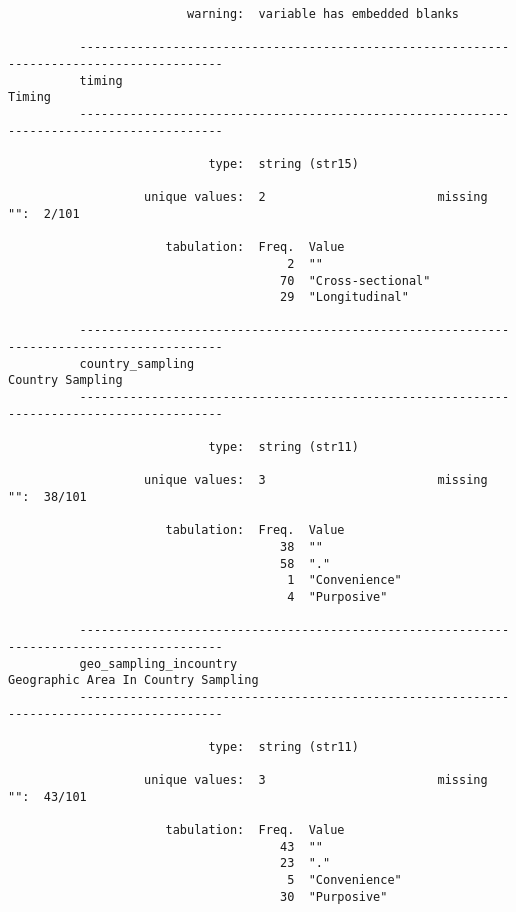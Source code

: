 \documentclass{article}
\begin{document}
\begin{verbatim}
                         warning:  variable has embedded blanks
          
          ------------------------------------------------------------------------------------------
          timing                                                                              Timing
          ------------------------------------------------------------------------------------------
          
                            type:  string (str15)
          
                   unique values:  2                        missing "":  2/101
          
                      tabulation:  Freq.  Value
                                       2  ""
                                      70  "Cross-sectional"
                                      29  "Longitudinal"
          
          ------------------------------------------------------------------------------------------
          country_sampling                                                          Country Sampling
          ------------------------------------------------------------------------------------------
          
                            type:  string (str11)
          
                   unique values:  3                        missing "":  38/101
          
                      tabulation:  Freq.  Value
                                      38  ""
                                      58  "."
                                       1  "Convenience"
                                       4  "Purposive"
          
          ------------------------------------------------------------------------------------------
          geo_sampling_incountry                                 Geographic Area In Country Sampling
          ------------------------------------------------------------------------------------------
          
                            type:  string (str11)
          
                   unique values:  3                        missing "":  43/101
          
                      tabulation:  Freq.  Value
                                      43  ""
                                      23  "."
                                       5  "Convenience"
                                      30  "Purposive"
          

\end{verbatim}
\end{document}
